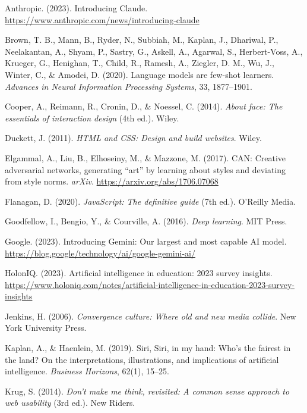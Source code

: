 \documentclass[12pt,a4paper]{report}
\begin{document}
\begin{thebibliography}{99}

Anthropic. (2023). Introducing Claude. \url{https://www.anthropic.com/news/introducing-claude}

Brown, T. B., Mann, B., Ryder, N., Subbiah, M., Kaplan, J., Dhariwal, P., Neelakantan, A., Shyam, P., Sastry, G., Askell, A., Agarwal, S., Herbert-Voss, A., Krueger, G., Henighan, T., Child, R., Ramesh, A., Ziegler, D. M., Wu, J., Winter, C., \& Amodei, D. (2020). Language models are few-shot learners. \textit{Advances in Neural Information Processing Systems}, 33, 1877–1901.

Cooper, A., Reimann, R., Cronin, D., \& Noessel, C. (2014). \textit{About face: The essentials of interaction design} (4th ed.). Wiley.

Duckett, J. (2011). \textit{HTML and CSS: Design and build websites}. Wiley.

Elgammal, A., Liu, B., Elhoseiny, M., \& Mazzone, M. (2017). CAN: Creative adversarial networks, generating ``art'' by learning about styles and deviating from style norms. \textit{arXiv}. \url{https://arxiv.org/abs/1706.07068}

Flanagan, D. (2020). \textit{JavaScript: The definitive guide} (7th ed.). O'Reilly Media.

Goodfellow, I., Bengio, Y., \& Courville, A. (2016). \textit{Deep learning}. MIT Press.

Google. (2023). Introducing Gemini: Our largest and most capable AI model. \url{https://blog.google/technology/ai/google-gemini-ai/}

HolonIQ. (2023). Artificial intelligence in education: 2023 survey insights. \url{https://www.holoniq.com/notes/artificial-intelligence-in-education-2023-survey-insights}

Jenkins, H. (2006). \textit{Convergence culture: Where old and new media collide}. New York University Press.

Kaplan, A., \& Haenlein, M. (2019). Siri, Siri, in my hand: Who's the fairest in the land? On the interpretations, illustrations, and implications of artificial intelligence. \textit{Business Horizons}, 62(1), 15–25.

Krug, S. (2014). \textit{Don't make me think, revisited: A common sense approach to web usability} (3rd ed.). New Riders.


\end{thebibliography}
\end{document}
